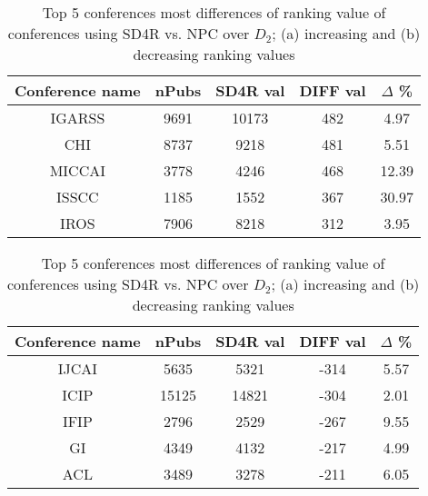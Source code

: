 \documentclass[lnicst]{svmultln}
\begin{document}
\begin{itemize}

\begin{table}
\begin{center}
\caption{Top 5 conferences most differences of ranking value of conferences using SD4R vs. NPC over $D_2$; (a) increasing and (b) decreasing ranking values}
\label{fig:conference}
\begin{minipage}{2in}
\begin{center}
{\scriptsize
\begin{tabular}{c|c|c|c|c}
\hline
Conference name	& nPubs	& SD4R val	& DIFF val	& $\Delta$ \% \\
\hline\hline
IGARSS	& 9691	& 10173	& 482	& 4.97 \\
CHI		& 8737	& 9218	& 481	& 5.51 \\
MICCAI	& 3778	& 4246	& 468	& 12.39 \\
ISSCC	& 1185	& 1552	& 367	& 30.97 \\
IROS 	& 7906	& 8218	& 312	& 3.95 \\
\hline
\end{tabular}
}
\end{center}
\end{minipage}
  \qquad
\begin{minipage}{2in}
\begin{center}
{\scriptsize
\begin{tabular}{c|c|c|c|c}
\hline
Conference name	& nPubs	& SD4R val	& DIFF val	& $\Delta$ \% \\
\hline\hline
IJCAI	& 5635	& 5321	& -314	& 5.57 \\
ICIP		& 15125	& 14821	& -304	& 2.01 \\
IFIP		& 2796	& 2529	& -267	& 9.55 \\
GI		& 4349	& 4132	& -217	& 4.99 \\
ACL		& 3489	& 3278	& -211	& 6.05 \\
\hline
\end{tabular}
}
\end{center}
\end{minipage}
\end{center}
\end{table}




\end{itemize}
\end{document}
